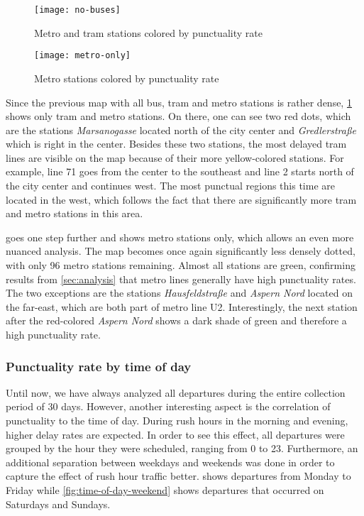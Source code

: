\begin{figure}[h]
	\centering
	\texttt{[image: no-buses]}
	\caption{Metro and tram stations colored by punctuality rate}
	\label{fig:no-buses-stations}
\end{figure}

\begin{figure}[h]
	\centering
	\texttt{[image: metro-only]}
	\caption{Metro stations colored by punctuality rate}
	\label{fig:metro-only-stations}
\end{figure}

Since the previous map with all bus, tram and metro stations is rather dense, \cref{fig:no-buses-stations} shows only tram and metro stations. On there, one can see two red dots, which are the stations \textit{Marsanogasse} located north of the city center and \textit{Gredlerstraße} which is right in the center. Besides these two stations, the most delayed tram lines are visible on the map because of their more yellow-colored stations. For example, line 71 goes from the center to the southeast and line 2 starts north of the city center and continues west. The most punctual regions this time are located in the west, which follows the fact that there are significantly more tram and metro stations in this area.

 goes one step further and shows metro stations only, which allows an even more nuanced analysis. The map becomes once again significantly less densely dotted, with only 96 metro stations remaining. Almost all stations are green, confirming results from \cref{sec:analysis} that metro lines generally have high punctuality rates. The two exceptions are the stations \textit{Hausfeldstraße} and \textit{Aspern Nord} located on the far-east, which are both part of metro line U2. Interestingly, the next station after the red-colored \textit{Aspern Nord} shows a dark shade of green and therefore a high punctuality rate.

\subsubsection{Punctuality rate by time of day}

Until now, we have always analyzed all departures during the entire collection period of 30 days. However, another interesting aspect is the correlation of punctuality to the time of day. During rush hours in the morning and evening, higher delay rates are expected. In order to see this effect, all departures were grouped by the hour they were scheduled, ranging from 0 to 23. Furthermore, an additional separation between weekdays and weekends was done in order to capture the effect of rush hour traffic better.  shows departures from Monday to Friday while \cref{fig:time-of-day-weekend} shows departures that occurred on Saturdays and Sundays.

